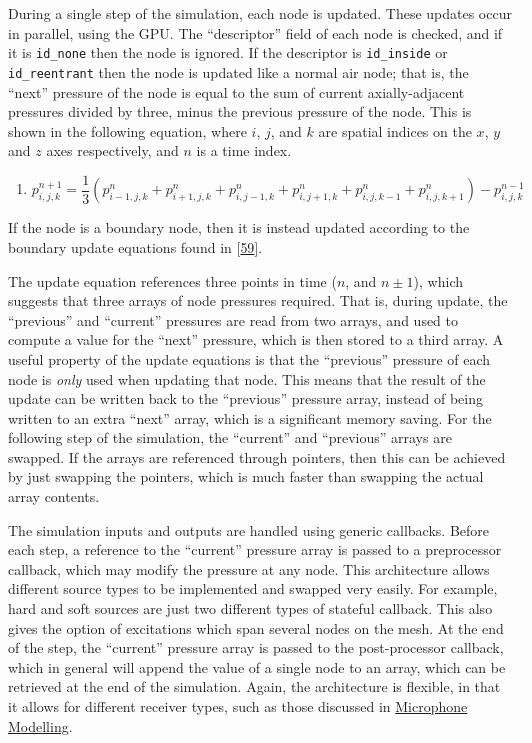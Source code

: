 \documentclass[]{scrreprt}
\providecommand{\tightlist}{%
  \setlength{\itemsep}{0pt}\setlength{\parskip}{0pt}}
\begin{document}
During a single step of the simulation, each node is updated. These
updates occur in parallel, using the GPU. The ``descriptor'' field of
each node is checked, and if it is \texttt{id\_none} then the node is
ignored. If the descriptor is \texttt{id\_inside} or
\texttt{id\_reentrant} then the node is updated like a normal air node;
that is, the ``next'' pressure of the node is equal to the sum of
current axially-adjacent pressures divided by three, minus the previous
pressure of the node. This is shown in the following equation, where
\(i\), \(j\), and \(k\) are spatial indices on the \(x\), \(y\) and
\(z\) axes respectively, and \(n\) is a time index.

\begin{enumerate}
\def\labelenumi{(\arabic{enumi})}
\setcounter{enumi}{24}
\tightlist
\item
  \[p_{i,j,k}^{n+1} = \frac{1}{3}(p_{i-1,j,k}^n + p_{i+1,j,k}^n + p_{i,j-1,k}^n + p_{i,j+1,k}^n + p_{i,j,k-1}^n + p_{i,j,k+1}^n) - p_{i,j,k}^{n-1}\]
\end{enumerate}

If the node is a boundary node, then it is instead updated according to
the boundary update equations found in
{[}\protect\hyperlink{ref-kowalczykux5fmodelingux5f2008}{59}{]}.

The update equation references three points in time (\(n\), and
\(n\pm 1\)), which suggests that three arrays of node pressures
required. That is, during update, the ``previous'' and ``current''
pressures are read from two arrays, and used to compute a value for the
``next'' pressure, which is then stored to a third array. A useful
property of the update equations is that the ``previous'' pressure of
each node is \emph{only} used when updating that node. This means that
the result of the update can be written back to the ``previous''
pressure array, instead of being written to an extra ``next'' array,
which is a significant memory saving. For the following step of the
simulation, the ``current'' and ``previous'' arrays are swapped. If the
arrays are referenced through pointers, then this can be achieved by
just swapping the pointers, which is much faster than swapping the
actual array contents.

The simulation inputs and outputs are handled using generic callbacks.
Before each step, a reference to the ``current'' pressure array is
passed to a preprocessor callback, which may modify the pressure at any
node. This architecture allows different source types to be implemented
and swapped very easily. For example, hard and soft sources are just two
different types of stateful callback. This also gives the option of
excitations which span several nodes on the mesh. At the end of the
step, the ``current'' pressure array is passed to the post-processor
callback, which in general will append the value of a single node to an
array, which can be retrieved at the end of the simulation. Again, the
architecture is flexible, in that it allows for different receiver
types, such as those discussed in
\href{\%7B\%7B\%20site.baseurl\%20\%7D\%7D\%7B\%\%20link\%20microphone.md\%20\%\%7D}{Microphone
Modelling}.
\end{document}
